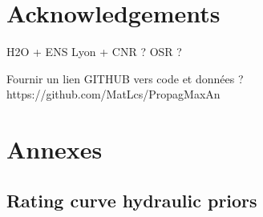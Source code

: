 \documentclass[11pt]{article}
\begin{document}
\section{Acknowledgements}

H2O + ENS Lyon + CNR ?
OSR ? 

Fournir un lien GITHUB vers code et données ? 
https://github.com/MatLcs/PropagMaxAn 

\newpage
\printbibliography
\newpage

\section{Annexes}

    \subsection{Rating curve hydraulic priors}
        
\end{document}
